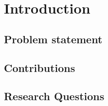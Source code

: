 \section{Introduction}

\subsection{Problem statement}

\subsection{Contributions}
\subsection{Research Questions}